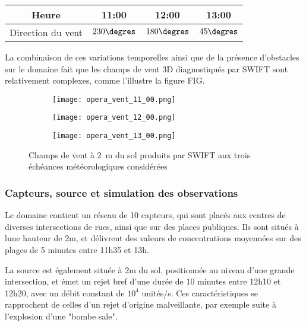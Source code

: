 \begin{center}
	\begin{tabular}{cccc}
		\centering
		Heure & 11:00 &  12:00 &  13:00\\ 
		\hline
		Direction du vent & $230\degres$ & $180\degres$ & $45\degres$
	\end{tabular} 
\end{center}

La combinaison de ces variations temporelles ainsi que de la présence d'obstacles sur le domaine fait que les champs de vent 3D diagnostiqués par SWIFT sont relativement complexes, comme l'illustre la figure FIG.

\begin{figure}[h!]
	\centering
	\begin{subfigure}[t]{0.5\textwidth}
		\centering
		\texttt{[image: opera\_vent\_11\_00.png]}
		\caption{}
		\label{opera_vent_11_00}
	\end{subfigure}%
	\begin{subfigure}[t]{0.5\textwidth}
		\centering
		\texttt{[image: opera\_vent\_12\_00.png]}
		\caption{}
		\label{opera_vent_12_00}
	\end{subfigure}
	\begin{subfigure}[t]{0.5\textwidth}
		\centering
		\texttt{[image: opera\_vent\_13\_00.png]}
		\caption{}
		\label{opera_vent_13_00}
	\end{subfigure}%
	\caption{Champs de vent à \SI{2}{\meter} du sol produits par SWIFT aux trois échéances météorologiques considérées}
	\label{fig_opera_vent}
	
\end{figure}



\subsubsection{Capteurs, source et simulation des observations}
Le domaine contient un réseau de 10 capteurs, qui sont placés aux centres de diverses intersections de rues, ainsi que sur des places publiques. Ils sont situés à lune hauteur de 2m, et délivrent des valeurs de concentrations moyennées sur des plages de 5 minutes entre 11h35 et 13h.

La source est également située à 2m du sol, positionnée au niveau d'une grande intersection, et émet un rejet bref d'une durée de 10 minutes entre 12h10 et 12h20, avec un débit constant de $10^4$ unités/s. Ces caractéristiques se rapprochent de celles d'un rejet d'origine malveillante, par exemple suite à l'explosion d'une "bombe sale". 

